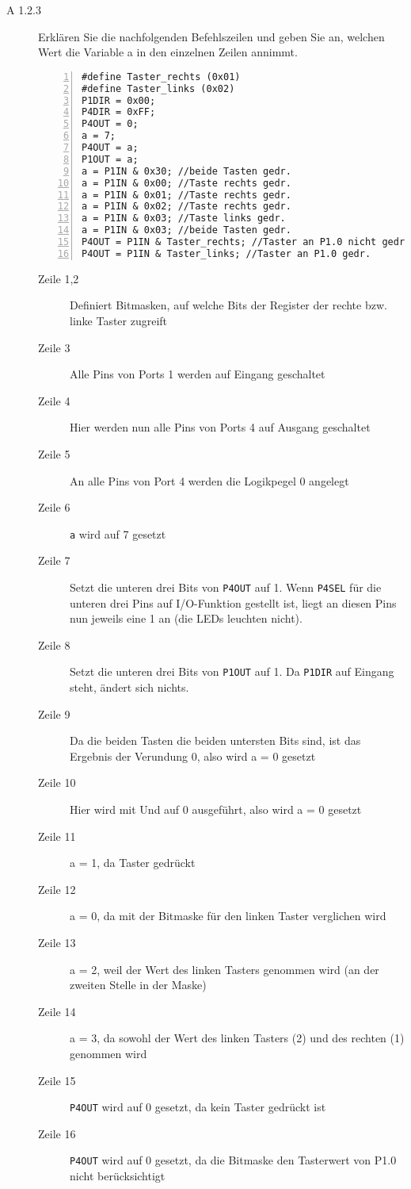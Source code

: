 \documentclass[11pt,a4paper,ngerman]{article}
\begin{document}
\begin{description}
	\item[A 1.2.3] Erklären Sie die nachfolgenden Befehlszeilen und geben Sie an, welchen Wert die Variable a in den einzelnen Zeilen annimmt. \\
	
	\begin{lstlisting}[numbers=left]
#define Taster_rechts (0x01)
#define Taster_links (0x02)
P1DIR = 0x00;
P4DIR = 0xFF;
P4OUT = 0;
a = 7;
P4OUT = a;
P1OUT = a;
a = P1IN & 0x30; //beide Tasten gedr.
a = P1IN & 0x00; //Taste rechts gedr.
a = P1IN & 0x01; //Taste rechts gedr.
a = P1IN & 0x02; //Taste rechts gedr.
a = P1IN & 0x03; //Taste links gedr.
a = P1IN & 0x03; //beide Tasten gedr.
P4OUT = P1IN & Taster_rechts; //Taster an P1.0 nicht gedr.
P4OUT = P1IN & Taster_links; //Taster an P1.0 gedr.
	\end{lstlisting}
	\newpage
	\begin{description}
		\item[Zeile 1,2] Definiert Bitmasken, auf welche Bits der Register der rechte bzw. linke Taster zugreift
		\item[Zeile 3] Alle Pins von Ports 1 werden auf Eingang geschaltet
		\item[Zeile 4] Hier werden nun alle Pins von Ports 4 auf Ausgang geschaltet
		\item[Zeile 5] An alle Pins von Port 4 werden die Logikpegel 0 angelegt
		\item[Zeile 6] \texttt{a} wird auf 7 gesetzt
		\item[Zeile 7] Setzt die unteren drei Bits von \texttt{P4OUT} auf 1. Wenn \texttt{P4SEL} für die unteren drei Pins auf I/O-Funktion gestellt ist, liegt an diesen Pins nun jeweils eine 1 an (die LEDs leuchten nicht).
		\item[Zeile 8] Setzt die unteren drei Bits von \texttt{P1OUT} auf 1. Da \texttt{P1DIR} auf Eingang steht, ändert sich nichts.
		\item[Zeile 9] Da die beiden Tasten die beiden untersten Bits sind, ist das Ergebnis der Verundung 0, also wird a = 0 gesetzt
		\item[Zeile 10] Hier wird mit Und auf 0 ausgeführt, also wird a = 0 gesetzt
		\item[Zeile 11] a = 1, da Taster gedrückt
		\item[Zeile 12] a = 0, da mit der Bitmaske für den linken Taster verglichen wird
		\item[Zeile 13] a = 2, weil der Wert des linken Tasters genommen wird (an der zweiten Stelle in der Maske)
		\item[Zeile 14] a = 3, da sowohl der Wert des linken Tasters (2) und des rechten (1) genommen wird
		\item[Zeile 15] \texttt{P4OUT} wird auf 0 gesetzt, da kein Taster gedrückt ist
		\item[Zeile 16] \texttt{P4OUT} wird auf 0 gesetzt, da die Bitmaske den Tasterwert von P1.0 nicht berücksichtigt
	\end{description}
	

\end{description}
\end{document}
